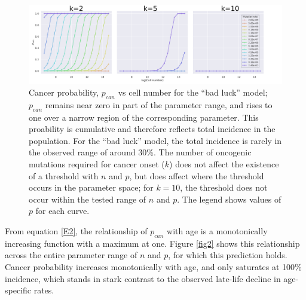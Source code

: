 \documentclass[10pt,twocolumn,twoside]{article}
\begin{document}
\begin{figure}[tbhp]
	\centering
	\includegraphics[width=\linewidth]{fig1.png}
	\caption{Cancer probability, $p_{can}$ vs cell number for the ``bad luck'' model; $p_{can}$ remains near zero in part of the parameter range, and rises to one over a narrow region of the corresponding parameter. This proability is cumulative and therefore reflects total incidence in the population. For the ``bad luck'' model, the total incidence is rarely in the observed range of around 30\%. The number of oncogenic mutations required for cancer onset ($k$) does not affect the existence of a threshold with $n$ and $p$, but does affect where the threshold occurs in the parameter space; for $k=10$, the threshold does not occur within the tested range of $n$ and $p$. The legend shows values of $p$ for each curve.}
	\label{fig1}
\end{figure}

From equation \ref{E2}, the relationship of $p_{can}$ with age is a monotonically increasing function with a maximum at one. Figure \ref{fig2} shows this relationship across the entire parameter range of $n$ and $p$, for which this prediction holds. Cancer probability increases monotonically with age, and only saturates at 100\% incidence, which stands in stark contrast to the observed late-life decline in age-specific rates.
\end{document}
